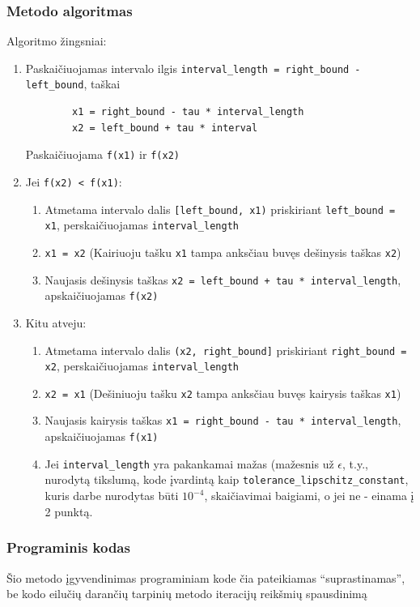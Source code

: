 \documentclass[lithuanian,a4paper,12pt]{article}
\newcommand{\mil}{\texttt}
\begin{document}
\subsubsection*{Metodo algoritmas}
Algoritmo žingsniai:
\begin{enumerate}
    \item Paskaičiuojamas intervalo ilgis \mil{interval_length = right_bound - left_bound}, taškai
    \begin{verbatim}
        x1 = right_bound - tau * interval_length 
        x2 = left_bound + tau * interval
    \end{verbatim}
    Paskaičiuojama \mil{f(x1)} ir \mil{f(x2)}
    \item Jei \mil{f(x2) < f(x1)}:
    \begin{enumerate}
        \item Atmetama intervalo dalis \mil{[left_bound, x1)} priskiriant \mil{left_bound = x1}, perskaičiuojamas \mil{interval_length}
        \item \mil{x1 = x2} (Kairiuoju tašku \mil{x1} tampa anksčiau buvęs dešinysis taškas \mil{x2})
        \item Naujasis dešinysis taškas \mil{x2 = left_bound + tau * interval_length}, apskaičiuojamas \mil{f(x2)}
    \end{enumerate}
    \item Kitu atveju:
    \begin{enumerate}
        \item Atmetama intervalo dalis \mil{(x2, right_bound]} priskiriant \mil{right_bound = x2},
        perskaičiuojamas \mil{interval_length}
        \item \mil{x2 = x1} (Dešiniuoju tašku \mil{x2} tampa anksčiau buvęs kairysis taškas \mil{x1}) 
        \item Naujasis kairysis taškas \mil{x1 = right_bound - tau * interval_length}, apskaičiuojamas \mil{f(x1)}
    \item Jei \mil{interval_length} yra pakankamai mažas (mažesnis už $\epsilon$, t.y., nurodytą tikslumą, kode įvardintą kaip \mil{tolerance_lipschitz_constant}, kuris darbe nurodytas būti $10^{-4}$, skaičiavimai baigiami, o jei ne - einama į 2 punktą. 
    \end{enumerate}
\end{enumerate}

\pagebreak
\subsubsection*{Programinis kodas}
Šio metodo įgyvendinimas programiniam kode čia pateikiamas ``suprastinamas'', be kodo eilučių darančių tarpinių metodo iteracijų reikšmių spausdinimą
\end{document}
